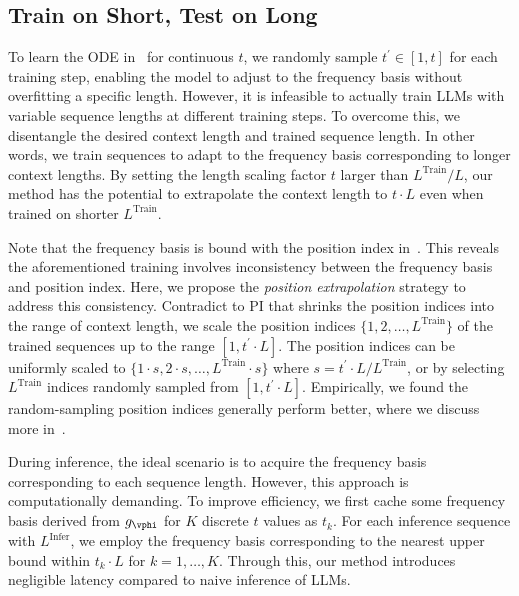 \subsection{Train on Short, Test on Long}
\label{subsec:training_testing}
To learn the ODE in~ for continuous $t$, we randomly sample $t^{\prime} \in [1, t]$ for each training step, enabling the model to adjust to the frequency basis without overfitting a specific length. However, it is infeasible to actually train LLMs with variable sequence lengths at different training steps. To overcome this, we disentangle the desired context length and trained sequence length. In other words, we train sequences to adapt to the frequency basis corresponding to longer context lengths.  By setting the length scaling factor $t$ larger than $L^{\text{Train}}/L$, our method has the potential to extrapolate the context length to $t\cdot L$ even when trained on shorter $L^{\text{Train}}$.

Note that the frequency basis is bound with the position index in~. This reveals the aforementioned training involves inconsistency between the frequency basis and position index. Here, we propose the \textit{position extrapolation} strategy to address this consistency. Contradict to PI that shrinks the position indices into the range of context length, we scale the position indices $\{1, 2, \dots, L^{\text{Train}}\}$ of the trained sequences up to the range $[1, t^\prime\!\cdot\! L]$. The position indices can be uniformly scaled to $\{1\!\cdot\! s, 2 \!\cdot\! s, \dots, L^{\text{Train}} \!\cdot\! s\}$ where $s=t^\prime\!\cdot\! L/L^{\text{Train}}$, or by selecting $L^{\text{Train}}$ indices randomly sampled from $[1, t^\prime\!\cdot\! L]$. Empirically, we found the random-sampling position indices generally perform better, where we discuss more in~.

During inference, the ideal scenario is to acquire the frequency basis corresponding to each sequence length. However, this approach is computationally demanding. To improve efficiency,  we first cache some frequency basis derived from $g_\vphi$ for $K$ discrete $t$ values as $t_k$. For each inference sequence with $L^{\text{Infer}}$, we employ the frequency basis corresponding to the nearest upper bound within $t_k \!\cdot\! L$ for $k=1,\dots, K$. Through this, our method introduces negligible latency compared to naive inference of LLMs.

